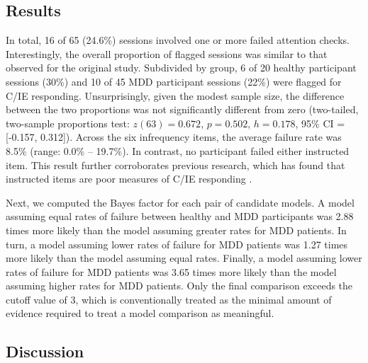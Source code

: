 \documentclass[a4paper,notitlepage,12pt]{article}
\begin{document}
\subsection*{Results}

In total, 16 of 65 (24.6\%) sessions involved one or more failed attention checks. Interestingly, the overall proportion of flagged sessions was similar to that observed for the original study. Subdivided by group, 6 of 20 healthy participant sessions (30\%) and 10 of 45 MDD participant sessions (22\%) were flagged for C/IE responding. Unsurprisingly, given the modest sample size, the difference between the two proportions was not significantly different from zero (two-tailed, two-sample proportions test: $z(63)=0.672$, $p=0.502$, $h=0.178$, 95\% CI = [-0.157, 0.312]). Across the six infrequency items, the average failure rate was 8.5\% (range: 0.0\% -- 19.7\%). In contrast, no participant failed either instructed item. This result further corroborates previous research, which has found that instructed items are poor measures of C/IE responding \cite{barends2019noncompliant-2, thomas2017validity-2, hauser2016attentive-2}.   

Next, we computed the Bayes factor for each pair of candidate models. A model assuming equal rates of failure between healthy and MDD participants was 2.88 times more likely than the model assuming greater rates for MDD patients. In turn, a model assuming lower rates of failure for MDD patients was 1.27 times more likely than the model assuming equal rates. Finally, a model assuming lower rates of failure for MDD patients was 3.65 times more likely than the model assuming higher rates for MDD patients. Only the final comparison exceeds the cutoff value of 3, which is conventionally treated as the minimal amount of evidence required to treat a model comparison as meaningful.  

\subsection*{Discussion}
\end{document}
